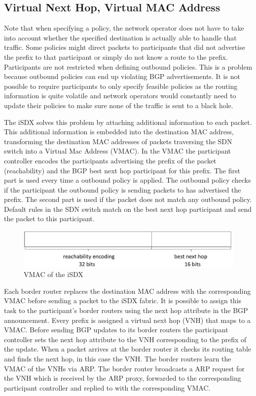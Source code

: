 \subsection{\label{chapter2:iSDX:VNH_VMAC}Virtual Next Hop, Virtual MAC Address}


Note that when specifying a policy, the network operator does not have to take into account whether the specified destination  is actually able to handle that traffic. Some policies might direct packets to participants that did not advertise the prefix to that participant or simply do not know a route to the prefix. Participants are not restricted when defining outbound policies. This is a problem because outbound policies can end up violating BGP advertisements. It is not possible to require participants to only specify feasible policies as the routing information is quite volatile and network operators would constantly need to update their policies to make sure none of the traffic is sent to a black hole. 

The iSDX solves this problem by attaching additional information to each packet. This additional information is embedded into the destination MAC address, transforming the destination MAC addresses of packets traversing the SDN switch into a Virtual Mac Address (VMAC).
In the VMAC the participant controller encodes the participants advertising the prefix of the packet (reachability) and the BGP best next hop participant for this prefix. The first part is used every time a outbound policy is applied. The outbound policy checks if the participant the outbound policy is sending packets to has advertised the prefix. The second part is used if the packet does not match any outbound policy. Default rules in the SDN switch match on the best next hop participant and send the packet to this participant.

\begin{figure}[h]
\center
\includegraphics[scale = 0.5]{Figures/sdx_vmac4_cropped.pdf}
\caption{VMAC of the iSDX}
\end{figure}

Each border router replaces the destination MAC address with the corresponding VMAC before sending a packet to the iSDX fabric. It is possible to assign this task to the participant's border routers using the next hop attribute in the BGP announcement. Every prefix is assigned a virtual next hop (VNH) that maps to a VMAC. Before sending BGP updates to its border routers the participant controller sets the next hop attribute to the VNH corresponding to the prefix of the update.  When a packet arrives at the border router it checks its routing table and finds the next hop, in this case the VNH. The border routers learn the VMAC of the VNHs via ARP. The border router broadcasts a ARP request for the VNH which is received by the ARP proxy, forwarded to the corresponding participant controller and replied to with the corresponding VMAC.

